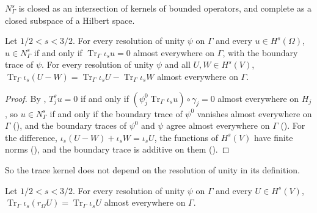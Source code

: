 $N^s_\Gamma$ is closed as an intersection of kernels of bounded operators, and complete as a
closed subspace of a Hilbert space.

\begin{theorem}
\label{thm:trace-kernel-boundary}
\leanok
{}
Let $1/2 < s < 3/2$. For every resolution of unity $\psi$ on $\Gamma$ and every
$u \in H^s(\Omega)$, $u \in N^s_\Gamma$ if and only if $\operatorname{Tr}_\Gamma \iota_s u = 0$
almost everywhere on $\Gamma$, with the boundary trace of $\psi$. For every resolution of
unity $\psi$ and all $U, W \in H^s(V)$,
$\operatorname{Tr}_\Gamma \iota_s(U - W) = \operatorname{Tr}_\Gamma \iota_s U -
\operatorname{Tr}_\Gamma \iota_s W$ almost everywhere on $\Gamma$.
\end{theorem}

\begin{proof}
\leanok
By , $T^s_j u = 0$ if and only if
$(\psi^0_j \operatorname{Tr}_\Gamma \iota_s u) \circ \gamma_j = 0$ almost everywhere on $H_j$, so
$u \in N^s_\Gamma$ if and only if the boundary trace of $\psi^0$ vanishes almost everywhere on
$\Gamma$ (), and the boundary traces of $\psi^0$ and $\psi$
agree almost everywhere on $\Gamma$ (). For the difference,
$\iota_s(U - W) + \iota_s W = \iota_s U$, the functions of $H^s(V)$ have finite norms
(), and the boundary trace is additive on them
().
\end{proof}

So the trace kernel does not depend on the resolution of unity in its definition.

\begin{lemma}
\label{lem:boundary-trace-restriction-sobolev}
\leanok
{}
Let $1/2 < s < 3/2$. For every resolution of unity $\psi$ on $\Gamma$ and every
$U \in H^s(V)$, $\operatorname{Tr}_\Gamma \iota_s(r_\Omega U) = \operatorname{Tr}_\Gamma
\iota_s U$ almost everywhere on $\Gamma$.
\end{lemma}

